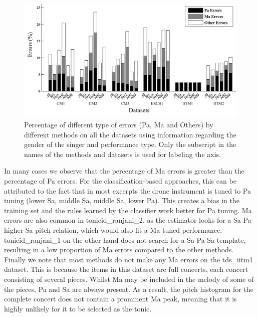 {\begin{figure}
	\begin{center}
		\includegraphics[width=\figSizeHundred]{ch05_preprocessing/figures/ErrorAnalysis_With_MF.pdf}
	\end{center}
	\caption[Percentage of Pa, Ma and `Other' type errors in tonic identification, using editorial metadata]{Percentage of different type of errors (Pa, Ma and Others) by different methods on all the datasets using information regarding the gender of the singer and performance type. Only the subscript in the names of the methods and datasets is used for labeling the axis.}
	\label{fig:tonic_identification_errors_with_MF}
\end{figure}

In many cases we observe that the percentage of Ma errors is greater than the percentage of Pa errors. For the classification-based approaches, this can be
attributed to the fact that in most excerpts the drone instrument is tuned to Pa tuning (lower Sa, middle Sa, middle Sa, lower Pa). This creates a
bias in the training set and the rules learned by the classifier work better for Pa tuning. Ma errors are also common in \acrshort{tonicid_ranjani_2}, as the estimator looks for a Sa-Pa-higher Sa pitch relation, which would also fit a Ma-tuned performance. \acrshort{tonicid_ranjani_1} on the other hand does not search for a Sa-Pa-Sa template, resulting in a low proportion of Ma errors compared to the other methods. Finally we note that most methods do not make any Ma errors on the \acrshort{tds_iitm1} dataset. This is because the items in this dataset are full concerts, each concert consisting of several pieces. Whilst Ma may be included in the melody of some of the pieces, Pa and Sa are always present. As a result, the pitch histogram for the complete concert does not contain a prominent Ma peak, meaning that it is highly unlikely for it to be selected as the tonic.

}
